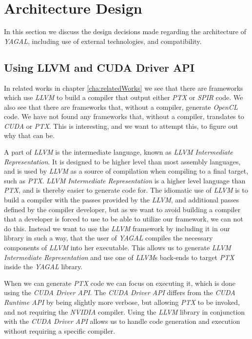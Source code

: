 \section{Architecture Design}
In this section we discuss the design decisions made regarding the architecture of \textit{YAGAL}, including use of external technologies, and compatibility.

\subsection{Using LLVM and CUDA Driver API}
In related works in chapter \ref{cha:relatedWorks} we see that there are frameworks which use \textit{LLVM} to build a compiler that output either \textit{PTX} or \textit{SPIR} code. We also see that there are frameworks that, without a compiler, generate \textit{OpenCL} code. We have not found any frameworks that, without a compiler, translates to \textit{CUDA} or \textit{PTX}. This is interesting, and we want to attempt this, to figure out why that can be.

A part of \textit{LLVM} is the intermediate language, known as \textit{LLVM Intermediate Representation}. It is designed to be higher level than most assembly languages, and is used by \textit{LLVM} as a source of compilation when compiling to a final target, such as \textit{PTX}. \textit{LLVM Intermediate Representation} is a higher level language than \textit{PTX}, and is thereby easier to generate code for. The idiomatic use of \textit{LLVM} is to build a compiler with the passes provided by the \textit{LLVM}, and additional passes defined by the compiler developer, but as we want to avoid building a compiler that a developer is forced to use to be able to utilize our framework, we can not do this. Instead we want to use the \textit{LLVM} framework by including it in our library in such a way, that the user of \textit{YAGAL} compiles the necessary components of \textit{LLVM} into her executable. This allows us to generate \textit{LLVM Intermediate Representation} and use one of \textit{LLVM}s back-ends to target \textit{PTX} inside the \textit{YAGAL} library.

When we can generate \textit{PTX} code we can focus on executing it, which is done using the \textit{CUDA Driver API}. The \textit{CUDA Driver API} differs from the \textit{CUDA Runtime API} by being slightly more verbose, but allowing \textit{PTX} to be invoked, and not requiring the \textit{NVIDIA} compiler. Using the \textit{LLVM} library in conjunction with the \textit{CUDA Driver API} allows us to handle code generation and execution without requiring a specific compiler.

